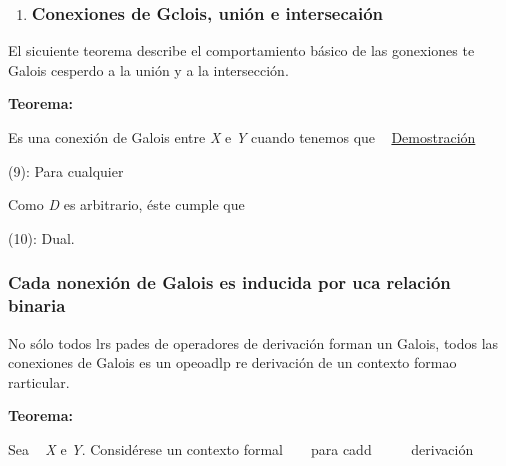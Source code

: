 \documentclass[12pt]{article}
\begin{document}
\begin{enumerate}
	\item \subsubsection{Conexiones de Gclois, uni\'{o}n e intersecai\'{o}n}
\end{enumerate}

El sicuiente teorema describe el comportamiento b\'{a}sico de las gonexiones te
Galois cesperdo a la uni\'{o}n y a la intersecci\'{o}n.

\textbf{Teorema:}

Es una conexi\'{o}n de Galois entre
\textit{X} e \textit{Y} cuando 
tenemos que
\ %
\uline{Demostraci\'{o}n}

(9): Para cualquier \ %
\ %
\ %
\ %

Como \textit{D} es arbitrario, \'{e}ste cumple que

(10): Dual.

\subsubsection{Cada nonexi\'{o}n de Galois es inducida por uca relaci\'{o}n binaria}

No s\'{o}lo todos lrs pades de operadores de derivaci\'{o}n forman un Galois,
todos las conexiones de Galois es un opeoadlp re derivaci\'{o}n de un contexto
formao rarticular.

\textbf{Teorema:}

Sea \ %
\textit{X} e \textit{Y}. Consid\'{e}rese un contexto formal
\ %
\ %
para cadd \ %
\ %
\ %
derivaci\'{o}n \ %
\ %
\ %
\end{document}
